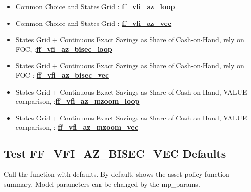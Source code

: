 \documentclass[
]{book}
\begin{document}
\begin{itemize}
\item
  Common Choice and States Grid :
  \href{https://github.com/FanWangEcon/MEconTools/blob/master/MEconTools/vfi/ff_vfi_az_loop.m}{\textbf{ff\_vfi\_az\_loop}}
\item
  Common Choice and States Grid :
  \href{https://github.com/FanWangEcon/MEconTools/blob/master/MEconTools/vfi/ff_vfi_az_vec.m}{\textbf{ff\_vfi\_az\_vec}}
\item
  States Grid + Continuous Exact Savings as Share of Cash-on-Hand,
  rely on FOC, :\href{https://github.com/FanWangEcon/MEconTools/blob/master/MEconTools/vfi/ff_vfi_az_bisec_loop.m}{\textbf{ff\_vfi\_az\_bisec\_loop}}
\item
  States Grid + Continuous Exact Savings as Share of Cash-on-Hand,
  rely on FOC :
  \href{https://github.com/FanWangEcon/MEconTools/blob/master/MEconTools/vfi/ff_vfi_az_bisec_vec.m}{\textbf{ff\_vfi\_az\_bisec\_vec}}
\item
  States Grid + Continuous Exact Savings as Share of Cash-on-Hand,
  VALUE comparison, :\href{https://github.com/FanWangEcon/MEconTools/blob/master/MEconTools/vfi/ff_vfi_az_mzoom_loop.m}{\textbf{ff\_vfi\_az\_mzoom\_loop}}
\item
  States Grid + Continuous Exact Savings as Share of Cash-on-Hand,
  VALUE comparison, :
  \href{https://github.com/FanWangEcon/MEconTools/blob/master/MEconTools/vfi/ff_vfi_az_mzoom_vec.m}{\textbf{ff\_vfi\_az\_mzoom\_vec}}
\end{itemize}

\hypertarget{test-ff_vfi_az_bisec_vec-defaults}{%
\subsection{Test FF\_VFI\_AZ\_BISEC\_VEC Defaults}\label{test-ff_vfi_az_bisec_vec-defaults}}

Call the function with defaults. By default, shows the asset policy
function summary. Model parameters can be changed by the mp\_params.
\end{document}

